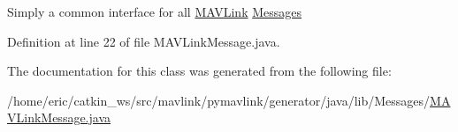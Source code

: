 Simply a common interface for all \mbox{\hyperlink{namespacecom_1_1MAVLink}{M\+A\+V\+Link}} \mbox{\hyperlink{namespacecom_1_1MAVLink_1_1Messages}{Messages}} 

Definition at line 22 of file M\+A\+V\+Link\+Message.\+java.



The documentation for this class was generated from the following file\+:\begin{DoxyCompactItemize}
\item 
/home/eric/catkin\+\_\+ws/src/mavlink/pymavlink/generator/java/lib/\+Messages/\mbox{\hyperlink{MAVLinkMessage_8java}{M\+A\+V\+Link\+Message.\+java}}\end{DoxyCompactItemize}
